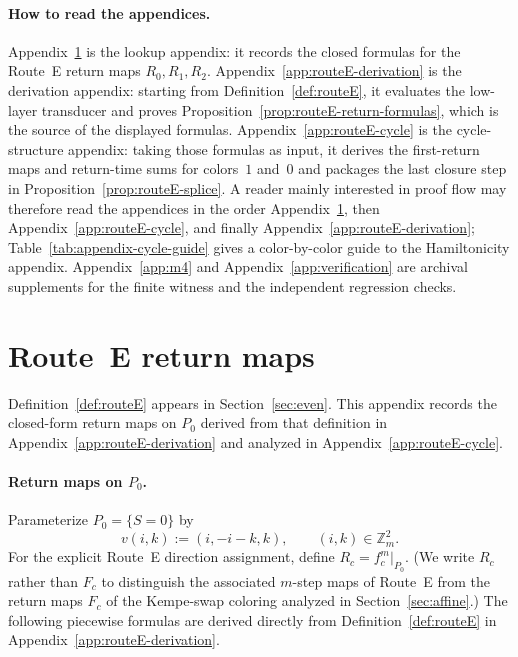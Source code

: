 \documentclass[11pt]{article}
\begin{document}
\paragraph{How to read the appendices.}
Appendix~\ref{app:routeE} is the lookup appendix: it records the closed formulas for the Route~E return maps $R_0,R_1,R_2$.
Appendix~\ref{app:routeE-derivation} is the derivation appendix: starting from Definition~\ref{def:routeE}, it evaluates the low-layer transducer and proves Proposition~\ref{prop:routeE-return-formulas}, which is the source of the displayed formulas.
Appendix~\ref{app:routeE-cycle} is the cycle-structure appendix: taking those formulas as input, it derives the first-return maps and return-time sums for colors~$1$ and~$0$ and packages the last closure step in Proposition~\ref{prop:routeE-splice}.
A reader mainly interested in proof flow may therefore read the appendices in the order Appendix~\ref{app:routeE}, then Appendix~\ref{app:routeE-cycle}, and finally Appendix~\ref{app:routeE-derivation}; Table~\ref{tab:appendix-cycle-guide} gives a color-by-color guide to the Hamiltonicity appendix.
Appendix~\ref{app:m4} and Appendix~\ref{app:verification} are archival supplements for the finite witness and the independent regression checks.
\section{Route~E return maps}\label{app:routeE}

Definition~\ref{def:routeE} appears in Section~\ref{sec:even}.
This appendix records the closed-form return maps on $P_0$ derived from that definition in Appendix~\ref{app:routeE-derivation} and analyzed in Appendix~\ref{app:routeE-cycle}.

\paragraph{Return maps on $P_0$.}
Parameterize $P_0=\{S=0\}$ by
\[
v(i,k):=(i,-i-k,k),\qquad (i,k)\in\mathbb Z_m^2.
\]
For the explicit Route~E direction assignment, define $R_c=f_c^m|_{P_0}$.
(We write $R_c$ rather than $F_c$ to distinguish the associated $m$-step maps of Route~E from the return maps $F_c$ of the Kempe-swap coloring analyzed in Section~\ref{sec:affine}.)
The following piecewise formulas are derived directly from Definition~\ref{def:routeE} in Appendix~\ref{app:routeE-derivation}.
\end{document}
